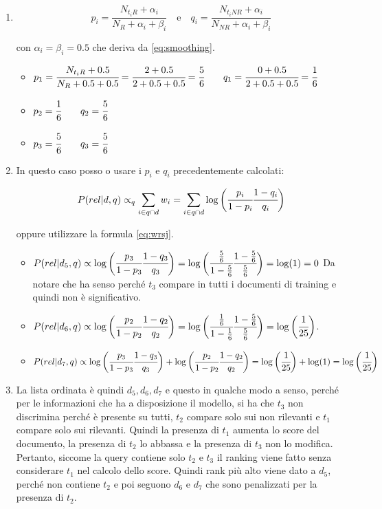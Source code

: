 \begin{enumerate}
	\item 
	$$
	\boxed{p_i = \frac{N_{t_iR} + \alpha_i}{N_R + \alpha_i + \beta_i}} \quad \text{e} \quad \boxed{q_i = \frac{N_{t_iNR} + \alpha_i}{N_{NR} + \alpha_i + \beta_i}}
	$$
	
	con $\alpha_i = \beta_i = 0.5$ che deriva da \ref{eq:smoothing}.
	\begin{itemize}
		\item $p_1 = \cfrac{N_{t_iR} + 0.5}{N_R + 0.5 + 0.5} =\cfrac{2 + 0.5}{2 + 0.5 + 0.5} = \cfrac{5}{6} \qquad q_1 = \cfrac{0 + 0.5}{2 + 0.5 + 0.5} = \cfrac{1}{6}$
		\item $p_2 = \cfrac{1}{6} \qquad q_2 = \cfrac{5}{6}$
		\item $p_3 = \cfrac{5}{6} \qquad q_3 = \cfrac{5}{6}$
	\end{itemize}
	\item In questo caso posso o usare i $p_i$ e $q_i$ precedentemente calcolati:
	
	$$P(rel|d,q) \propto_q \sum_{i \in q \cap d}w_i = \sum_{i \in q \cap d}\log\bigg(\cfrac{p_i}{1-p_i} \cfrac{1- q_i}{q_i}\bigg)$$
	
	oppure utilizzare la formula \ref{eq:wrsj}.
	\begin{itemize}
		\item $P(rel | d_5, q) \propto \log\bigg(\cfrac{p_3}{1-p_3}\cfrac{1-q_3}{q_3}\bigg) = \log\bigg(\cfrac{\frac{5}{6}}{1-\frac{5}{6}}\cfrac{1-\frac{5}{6}}{\frac{5}{6}}\bigg) = \log(1) = 0 $ Da notare che ha senso perché $t_3$ compare in tutti i documenti di training e quindi non è significativo.
		\item $P(rel | d_6, q) \propto \log\bigg(\cfrac{p_2}{1-p_2}\cfrac{1-q_2}{q_2}\bigg) = \log\bigg(\cfrac{\frac{1}{6}}{1-\frac{1}{6}}\cfrac{1-\frac{5}{6}}{\frac{5}{6}}\bigg) = \log\bigg(\cfrac{1}{25}\bigg)$. 
		\item $P(rel | d_7, q) \propto \log\bigg(\cfrac{p_3}{1-p_3}\cfrac{1-q_3}{q_3}\bigg) +\log\bigg(\cfrac{p_2}{1-p_2}\cfrac{1-q_2}{q_2}\bigg) = \log\bigg(\cfrac{1}{25}\bigg)+ \log(1)= \log\bigg(\cfrac{1}{25}\bigg)$
	\end{itemize}
	\item La lista ordinata è quindi $d_5, d_6, d_7$ e questo in qualche modo a senso, perché per le informazioni che ha a disposizione il modello, si ha che $t_3$ non discrimina perché è presente su tutti, $t_2$ compare solo sui non rilevanti e $t_1$ compare solo sui rilevanti. Quindi la presenza di $t_1$ aumenta lo score del documento, la presenza di $t_2$ lo abbassa e la presenza di $t_3$ non lo modifica. 
	Pertanto, siccome la query contiene solo $t_2$ e $t_3$ il ranking viene fatto senza considerare $t_1$ nel calcolo dello score. Quindi rank più alto viene dato a $d_5$, perché non contiene $t_2$ e poi seguono $d_6$ e $d_7$ che sono penalizzati per la presenza di $t_2$.
\end{enumerate}


